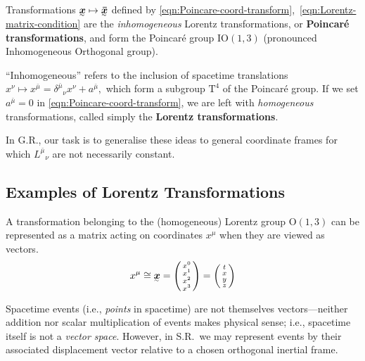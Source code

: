 Transformations $\ts x \mapsto \ts{\bar x}$ defined by \eqref{eqn:Poincare-coord-transform},~\eqref{eqn:Lorentz-matrix-condition} are the \textit{inhomogeneous} Lorentz transformations, or \textbf{Poincaré transformations}, and form the Poincaré group $\mathrm{IO}(1,3)$ (pronounced Inhomogeneous Orthogonal group).



\begin{wrapfigure}[8]{r}{5cm}
    \vspace*{-\baselineskip}
    
\end{wrapfigure}

``Inhomogeneous'' refers to the inclusion of spacetime translations
\begin{math}
    x^\nu \mapsto x^{\bar\mu} = \delta^{\bar\mu}{}_\nu x^\nu + a^{\bar\mu}
,\end{math}
which form a subgroup $\mathrm{T}^4$ of the Poincaré group.
If we set $a^{\bar\mu} = 0$ in \eqref{eqn:Poincare-coord-transform}, we are left with \textit{homogeneous} transformations, called simply the \textbf{Lorentz transformations}.


In G.R., our task is to generalise these ideas to general coordinate frames for which $L^{\bar\mu}{}_\nu$ are not necessarily constant.


\subsection{Examples of Lorentz Transformations}

A transformation belonging to the (homogeneous) Lorentz group $\mathrm{O}(1,3)$ can be represented as a matrix acting on coordinates $x^\mu$ when they are viewed as vectors.
\begin{align}
    x^\mu \cong \ts{x} = \smqty(x^0 \\ x^1 \\ x^2 \\ x^3)
    = \smqty(t \\ x \\ y \\ z)
\end{align}

\begin{note}
    Spacetime events (i.e., \textit{points} in spacetime) are not themselves vectors---neither addition nor scalar multiplication of events makes physical sense; i.e., spacetime itself is not a \textit{vector space}.
    However, in S.R.\ we may represent events by their associated displacement vector relative to a chosen orthogonal inertial frame.
\end{note}

